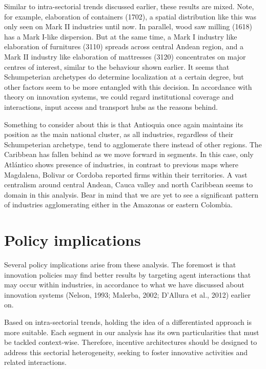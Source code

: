 \documentclass[12pt,a4paper]{article}
\begin{document}
Similar to intra-sectorial trends discussed earlier, these results are mixed. Note, for example, elaboration of containers (1702), a spatial distribution like this was only seen on Mark II industries until now. In parallel, wood saw milling (1618) has a Mark I-like dispersion. But at the same time, a Mark I industry like elaboration of furnitures (3110) spreads across central Andean region, and a Mark II industry like elaboration of mattresses (3120) concentrates on major centres of interest, similar to the behaviour shown earlier. It seems that Schumpeterian archetypes do determine localization at a certain degree, but other factors seem to be more entangled with this decision. In accordance with theory on innovation systems, we could regard institutional coverage and interactions, input access and transport hubs as the reasons behind.

Something to consider about this is that Antioquia once again maintains its position as the main national cluster, as all industries, regardless of their Schumpeterian archetype, tend to agglomerate there instead of other regions. The Caribbean has fallen behind as we move forward in segments. In this case, only Atlántico shows presence of industries, in contrast to previous maps where Magdalena, Bolivar or Cordoba reported firms within their territories. A vast centralism around central Andean, Cauca valley and north Caribbean seems to domain in this analysis. Bear in mind that we are yet to see a significant pattern of industries agglomerating either in the Amazonas or eastern Colombia.

\section{Policy implications}

Several policy implications arise from these analysis. The foremost is that innovation policies may find better results by targeting agent interactions that may occur within industries, in accordance to what we have discussed about innovation systems (Nelson, 1993; Malerba, 2002; D'Allura et al., 2012) earlier on.

Based on intra-sectorial trends, holding the idea of a differentiated approach is more suitable. Each segment in our analysis has its own particularities that must be tackled context-wise. Therefore, incentive architectures should be designed to address this sectorial heterogeneity, seeking to foster innovative activities and related interactions.
\end{document}
